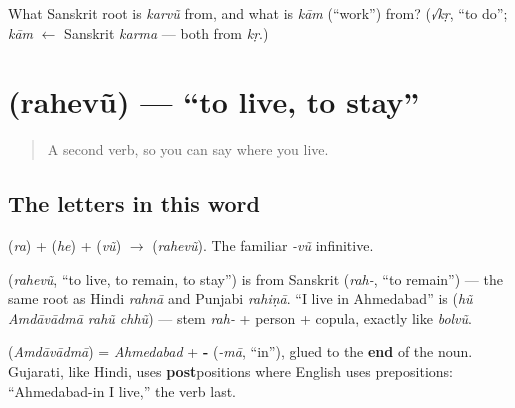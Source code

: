 \begin{tcolorbox}[breakable,colback=teal!4,colframe=teal!35!black,title={Before you move on}]
What Sanskrit root is \emph{karvũ} from, and what is \emph{kām} (\textquotedblleft{}work\textquotedblright{}) from? (\emph{√kṛ}, \textquotedblleft{}to do\textquotedblright{}; \emph{kām} $\leftarrow$ Sanskrit \emph{karma} — both from \emph{kṛ}.)
\end{tcolorbox}
\section[\gu{રહેવું}]{ (rahevũ) — \textquotedblleft{}to live, to stay\textquotedblright{}}

\label{lesson:GU-C05-rahevun}



\begin{quote}
A second verb, so you can say where you live.
\end{quote}

\subsection*{The letters in this word}
\textbf{} (\emph{ra}) + \textbf{} (\emph{he}) + \textbf{} (\emph{vũ}) $\to$ \textbf{} (\emph{rahevũ}). The familiar \emph{-vũ} infinitive.

\begin{cousinweb}
\textbf{} (\emph{rahevũ}, \textquotedblleft{}to live, to remain, to stay\textquotedblright{}) is from Sanskrit \textbf{} (\emph{rah-}, \textquotedblleft{}to remain\textquotedblright{}) — the same root as Hindi \emph{rahnā} and Punjabi \emph{rahiṇā}. \textquotedblleft{}I live in Ahmedabad\textquotedblright{} is \textbf{   } (\emph{hũ Amdāvādmā rahũ chhũ}) — stem \emph{rah-} + person + copula, exactly like \emph{bolvũ}.
\end{cousinweb}

\begin{grammarlens}[title={Grammar Lens: \textquotedblleft{}in\textquotedblright{} comes after the noun}]
\textbf{} (\emph{Amdāvādmā}) = \emph{Ahmedabad} + \textbf{-} (\emph{-mā}, \textquotedblleft{}in\textquotedblright{}), glued to the \textbf{end} of the noun. Gujarati, like Hindi, uses \textbf{post}positions where English uses prepositions: \textquotedblleft{}Ahmedabad-in I live,\textquotedblright{} the verb last.
\end{grammarlens}

